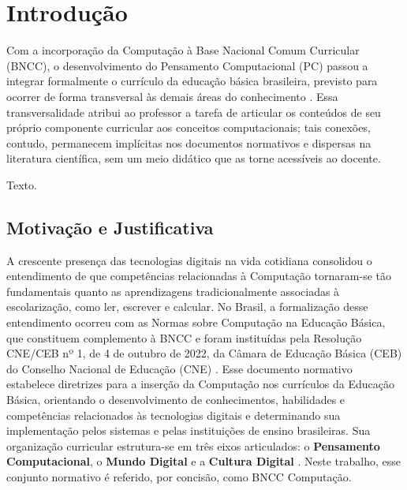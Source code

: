 \chapter{Introdução}
\label{sec-intro}

Com a incorporação da Computação à Base Nacional Comum Curricular (BNCC), o desenvolvimento do Pensamento Computacional (PC) passou a integrar formalmente o currículo da educação básica brasileira, previsto para ocorrer de forma transversal às demais áreas do conhecimento \cite{brasil2022computacao, brasil2022parecer}. Essa transversalidade atribui ao professor a tarefa de articular os conteúdos de seu próprio componente curricular aos conceitos computacionais; tais conexões, contudo, permanecem implícitas nos documentos normativos e dispersas na literatura científica, sem um meio didático que as torne acessíveis ao docente.

Texto.


\section{Motivação e Justificativa}
\label{sec-intro-motjus}

A crescente presença das tecnologias digitais na vida cotidiana consolidou o entendimento de que competências relacionadas à Computação tornaram-se tão fundamentais quanto as aprendizagens tradicionalmente associadas à escolarização, como ler, escrever e calcular. No Brasil, a formalização desse entendimento ocorreu com as Normas sobre Computação na Educação Básica, que constituem complemento à BNCC e foram instituídas pela Resolução CNE/CEB nº 1, de 4 de outubro de 2022, da Câmara de Educação Básica (CEB) do Conselho Nacional de Educação (CNE) \cite{brasil2022computacao}. Esse documento normativo estabelece diretrizes para a inserção da Computação nos currículos da Educação Básica, orientando o desenvolvimento de conhecimentos, habilidades e competências relacionados às tecnologias digitais e determinando sua implementação pelos sistemas e pelas instituições de ensino brasileiras. Sua organização curricular estrutura-se em três eixos articulados: o \textbf{Pensamento Computacional}, o \textbf{Mundo Digital} e a \textbf{Cultura Digital} \cite{brasil2022complemento}. Neste trabalho, esse conjunto normativo é referido, por concisão, como BNCC Computação.

